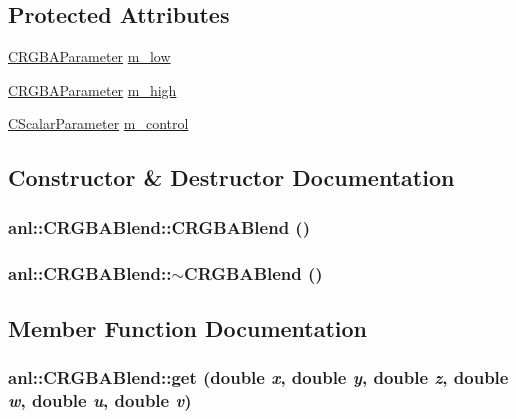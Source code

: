 \subsection*{Protected Attributes}
\begin{DoxyCompactItemize}
\item 
\hyperlink{classanl_1_1CRGBAParameter}{CRGBAParameter} \hyperlink{classanl_1_1CRGBABlend_a836e47fb212a578353fc9bdbf59851cf}{m\_\-low}
\item 
\hyperlink{classanl_1_1CRGBAParameter}{CRGBAParameter} \hyperlink{classanl_1_1CRGBABlend_a8705dc0a379c270a3449e8ca5a27de55}{m\_\-high}
\item 
\hyperlink{classanl_1_1CScalarParameter}{CScalarParameter} \hyperlink{classanl_1_1CRGBABlend_a67620ea84f5da10b93016bf7260fac47}{m\_\-control}
\end{DoxyCompactItemize}


\subsection{Constructor \& Destructor Documentation}
\hypertarget{classanl_1_1CRGBABlend_ad108c5971437662b24d368b1c89ae7e3}{
\subsubsection[{CRGBABlend}]{\setlength{\rightskip}{0pt plus 5cm}anl::CRGBABlend::CRGBABlend ()}}
\label{classanl_1_1CRGBABlend_ad108c5971437662b24d368b1c89ae7e3}
\hypertarget{classanl_1_1CRGBABlend_a5bdbefc0c194df5ab4e20bde19a94633}{
\subsubsection[{$\sim$CRGBABlend}]{\setlength{\rightskip}{0pt plus 5cm}anl::CRGBABlend::$\sim$CRGBABlend ()}}
\label{classanl_1_1CRGBABlend_a5bdbefc0c194df5ab4e20bde19a94633}


\subsection{Member Function Documentation}
\hypertarget{classanl_1_1CRGBABlend_a2bb566fe4302196bc650ad36048bee15}{
\subsubsection[{get}]{ anl::CRGBABlend::get (double {\em x}, \/  double {\em y}, \/  double {\em z}, \/  double {\em w}, \/  double {\em u}, \/  double {\em v})}}
\label{classanl_1_1CRGBABlend_a2bb566fe4302196bc650ad36048bee15}


